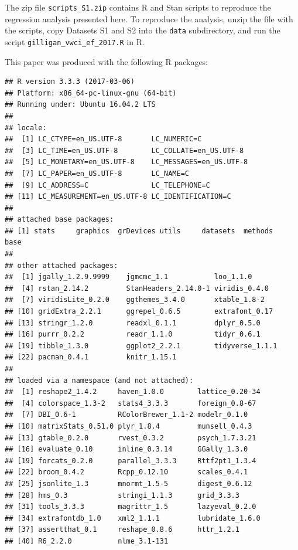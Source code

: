 \documentclass[draft]{agujournal}
\begin{document}
The zip file \verb+scripts_S1.zip+ contains R and Stan scripts to reproduce the regression analysis presented here.
To reproduce the analysis, unzip the file with the scripts, copy Datasets S1 and S2 into the \verb+data+ subdirectory, and run the script \verb+gilligan_vwci_ef_2017.R+ in R.

This paper was produced with the following R packages:


\begin{verbatim}
## R version 3.3.3 (2017-03-06)
## Platform: x86_64-pc-linux-gnu (64-bit)
## Running under: Ubuntu 16.04.2 LTS
## 
## locale:
##  [1] LC_CTYPE=en_US.UTF-8       LC_NUMERIC=C              
##  [3] LC_TIME=en_US.UTF-8        LC_COLLATE=en_US.UTF-8    
##  [5] LC_MONETARY=en_US.UTF-8    LC_MESSAGES=en_US.UTF-8   
##  [7] LC_PAPER=en_US.UTF-8       LC_NAME=C                 
##  [9] LC_ADDRESS=C               LC_TELEPHONE=C            
## [11] LC_MEASUREMENT=en_US.UTF-8 LC_IDENTIFICATION=C       
## 
## attached base packages:
## [1] stats     graphics  grDevices utils     datasets  methods   base     
## 
## other attached packages:
##  [1] jgally_1.2.9.9999    jgmcmc_1.1           loo_1.1.0           
##  [4] rstan_2.14.2         StanHeaders_2.14.0-1 viridis_0.4.0       
##  [7] viridisLite_0.2.0    ggthemes_3.4.0       xtable_1.8-2        
## [10] gridExtra_2.2.1      ggrepel_0.6.5        extrafont_0.17      
## [13] stringr_1.2.0        readxl_0.1.1         dplyr_0.5.0         
## [16] purrr_0.2.2          readr_1.1.0          tidyr_0.6.1         
## [19] tibble_1.3.0         ggplot2_2.2.1        tidyverse_1.1.1     
## [22] pacman_0.4.1         knitr_1.15.1        
## 
## loaded via a namespace (and not attached):
##  [1] reshape2_1.4.2     haven_1.0.0        lattice_0.20-34   
##  [4] colorspace_1.3-2   stats4_3.3.3       foreign_0.8-67    
##  [7] DBI_0.6-1          RColorBrewer_1.1-2 modelr_0.1.0      
## [10] matrixStats_0.51.0 plyr_1.8.4         munsell_0.4.3     
## [13] gtable_0.2.0       rvest_0.3.2        psych_1.7.3.21    
## [16] evaluate_0.10      inline_0.3.14      GGally_1.3.0      
## [19] forcats_0.2.0      parallel_3.3.3     Rttf2pt1_1.3.4    
## [22] broom_0.4.2        Rcpp_0.12.10       scales_0.4.1      
## [25] jsonlite_1.3       mnormt_1.5-5       digest_0.6.12     
## [28] hms_0.3            stringi_1.1.3      grid_3.3.3        
## [31] tools_3.3.3        magrittr_1.5       lazyeval_0.2.0    
## [34] extrafontdb_1.0    xml2_1.1.1         lubridate_1.6.0   
## [37] assertthat_0.1     reshape_0.8.6      httr_1.2.1        
## [40] R6_2.2.0           nlme_3.1-131
\end{verbatim}
\end{document}
